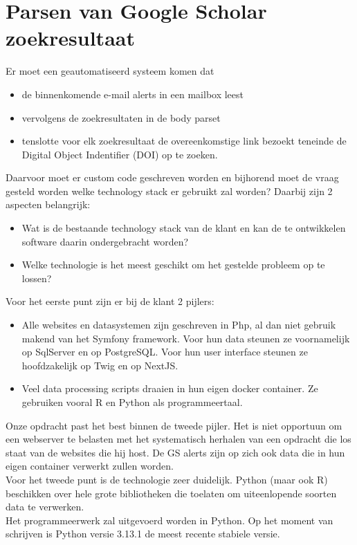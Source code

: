 \section{Parsen van Google Scholar zoekresultaat}
Er moet een geautomatiseerd systeem komen dat 
\begin{itemize}
  \item de binnenkomende e-mail alerts in een mailbox leest
  \item vervolgens de zoekresultaten in de body parset
  \item tenslotte voor elk zoekresultaat de overeenkomstige link bezoekt teneinde de Digital Object Indentifier (DOI) op te zoeken.
\end{itemize}
Daarvoor moet er custom code geschreven worden en bijhorend moet de vraag gesteld worden welke technology stack er gebruikt zal worden? Daarbij zijn 2 aspecten belangrijk:
\begin{itemize}
    \item Wat is de bestaande technology stack van de klant en kan de te ontwikkelen software daarin ondergebracht worden?
    \item Welke technologie is het meest geschikt om het gestelde probleem op te lossen?
\end{itemize}
Voor het eerste punt zijn er bij de klant 2 pijlers:
\begin{itemize}
    \item Alle websites en datasystemen zijn geschreven in Php, al dan niet gebruik makend van het Symfony framework. Voor hun data steunen ze voornamelijk op SqlServer en op PostgreSQL. Voor hun user interface steunen ze hoofdzakelijk op Twig en op NextJS.
    \item Veel data processing scripts draaien in hun eigen docker container. Ze gebruiken vooral R en Python als programmeertaal.
\end{itemize}
Onze opdracht past het best binnen de tweede pijler. Het is niet opportuun om een webserver te belasten met het systematisch herhalen van een opdracht die los staat van de websites die hij host. De GS alerts zijn op zich ook data die in hun eigen container verwerkt zullen worden.\\
Voor het tweede punt is de technologie zeer duidelijk. Python (maar ook R) beschikken over hele grote bibliotheken die toelaten om uiteenlopende soorten data te verwerken.\\
Het programmeerwerk zal uitgevoerd worden in Python. Op het moment van schrijven is Python versie 3.13.1 de meest recente stabiele versie.
